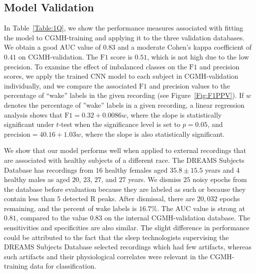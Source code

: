\documentclass[10pt,a4paper,english]{amsart}
\begin{document}
\subsection{Model Validation}

In Table~\ref{Table:1Q}, we show the performance measures associated with fitting the model to CGMH-training and applying it to the three validation databases. We obtain a good $\mathrm{AUC}$ value of $0.83$ and a moderate Cohen's kappa coefficient of $0.41$ on CGMH-validation. The $\mathrm{F1}$ score is $0.51$, which is not high due to the low precision. To examine the effect of imbalanced classes on the $\mathrm{F1}$ and precision scores, we apply the trained CNN model to each subject in CGMH-validation individually, and we compare the associated $\mathrm{F1}$ and precision values to the percentage of ``wake'' labels in the given recording (see Figure~\ref{Fig:F1PPV}).
If $w$ denotes the percentage of ''wake'' labels in a given recording, a linear regression analysis shows that $\mathrm{F1}=0.32+0.0086w$, where the slope is statistically significant under $t$-test when the significance level is set to $p=0.05$, and $\mathrm{precision} =40.16+1.03w$, where the slope is also statistically significant.

We show that our model performs well when applied to external recordings that are associated with healthy subjects of a different race. The DREAMS Subjects Database has recordings from $16$ healthy females aged $35.8 \pm 15.5$ years and $4$ healthy males as aged $20$, $23$, $27$, and $27$ years.   We dismiss $25$ noisy epochs from the database before evaluation because they are labeled as such or because they contain less than $5$ detected R peaks.  After dismissal, there are $20,032$ epochs remaining, and the percent of wake labels is $16.7 \%$.  The $\mathrm{AUC}$ value is strong at $0.81$, compared to the value $0.83$ on the internal CGMH-validation database.  The sensitivities and specificities are also similar.  The slight difference in performance could be attributed to the fact that the sleep technologists supervising the DREAMS Subjects Database selected recordings which had few artifacts, whereas such artifacts and their physiological correlates were relevant in the CGMH-training data for classification.
\end{document}
